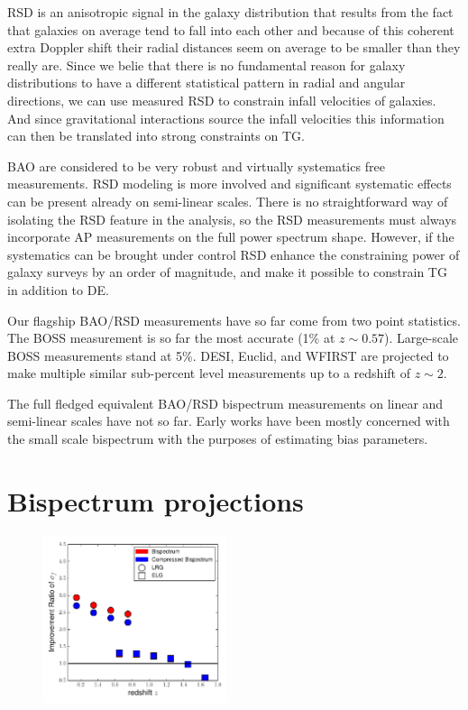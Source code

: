 RSD is an anisotropic signal in the galaxy distribution that results from the
fact that galaxies on average tend to fall into each other and because of this
coherent extra Doppler shift their radial distances seem on average to be
smaller than they really are. Since we belie that there is no fundamental
reason for galaxy distributions to have a different statistical pattern in
radial and angular directions, we can use measured RSD to constrain infall
velocities of galaxies. And since gravitational interactions source the infall
velocities this information can then be translated into strong constraints on
TG.

BAO are considered to be very robust and virtually systematics free
measurements. RSD modeling is more involved and significant systematic effects
can be present already on semi-linear scales. There is no straightforward way
of isolating the RSD feature in the analysis, so the RSD measurements must
always incorporate AP measurements on the full power spectrum shape. However,
if the systematics can be brought under control RSD enhance the constraining
power of galaxy surveys by an order of magnitude, and make it possible to
constrain TG in addition to DE.

Our flagship BAO/RSD measurements have so far come from two point statistics.
The BOSS measurement is so far the most accurate (1\% at $z\sim0.57$).
Large-scale BOSS measurements stand at 5\%.  DESI, Euclid, and WFIRST are
projected to make multiple similar sub-percent level measurements up to a
redshift of $z\sim 2$.

The full fledged equivalent BAO/RSD bispectrum measurements on linear and
semi-linear scales have not so far. Early works have been mostly concerned with
the small scale bispectrum with the purposes of estimating bias parameters.

\section{Bispectrum projections}

\begin{figure}
\begin{center}
\includegraphics[width=0.48\textwidth]{fz.pdf}
\end{center}
\end{figure}


